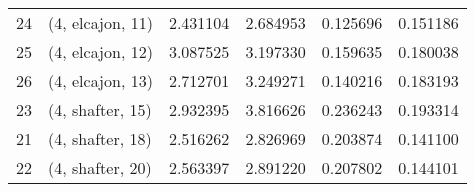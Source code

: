 \begin{tabular}{llrrrr}
24 &  (4, elcajon, 11) &   2.431104 &   2.684953 &   0.125696 &  0.151186 \\
25 &  (4, elcajon, 12) &   3.087525 &   3.197330 &   0.159635 &  0.180038 \\
26 &  (4, elcajon, 13) &   2.712701 &   3.249271 &   0.140216 &  0.183193 \\
23 &  (4, shafter, 15) &   2.932395 &   3.816626 &   0.236243 &  0.193314 \\
21 &  (4, shafter, 18) &   2.516262 &   2.826969 &   0.203874 &  0.141100 \\
22 &  (4, shafter, 20) &   2.563397 &   2.891220 &   0.207802 &  0.144101 \\
\bottomrule
\end{tabular}
